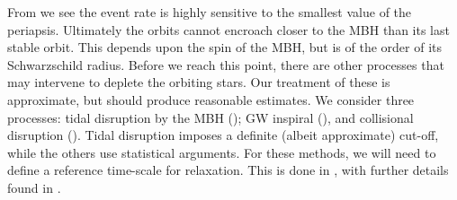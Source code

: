 From  we see the event rate is highly sensitive to the smallest value of the periapsis. Ultimately the orbits cannot encroach closer to the MBH than its last stable orbit. This depends upon the spin of the MBH, but is of the order of its Schwarzschild radius. Before we reach this point, there are other processes that may intervene to deplete the orbiting stars. Our treatment of these is approximate, but should produce reasonable estimates. We consider three processes: tidal disruption by the MBH (); GW inspiral (), and collisional disruption (). Tidal disruption imposes a definite (albeit approximate) cut-off, while the others use statistical arguments. For these methods, we will need to define a reference time-scale for relaxation. This is done in , with further details found in .

